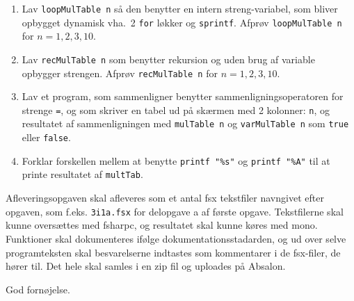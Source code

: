 \documentclass[a4paper,12pt]{article}
\begin{document}
\begin{enumerate}[label=3i.\arabic*,start=0]
\begin{enumerate}
  \item Lav \lstinline!loopMulTable n! så den benytter en intern streng-variabel, som bliver opbygget dynamisk vha.\ 2 \lstinline!for! løkker og \lstinline!sprintf!.  Afprøv \lstinline!loopMulTable n! for $n= 1, 2, 3, 10$.
  \item Lav \lstinline!recMulTable n! som benytter rekursion og uden brug af variable opbygger strengen. Afprøv \lstinline!recMulTable n! for $n= 1, 2, 3, 10$.
  \item Lav et program, som sammenligner benytter sammenligningsoperatoren for strenge \lstinline!=!, og som skriver en tabel ud på skærmen med 2 kolonner: \lstinline!n!, og resultatet af sammenligningen med \lstinline!mulTable n! og \lstinline!varMulTable n! som \lstinline!true! eller \lstinline!false!.
  \item Forklar forskellen mellem at benytte \lstinline!printf "%s"! og \lstinline!printf "%A"! til at printe resultatet af \lstinline!multTab!.
  \end{enumerate}
\end{enumerate}
Afleveringsopgaven skal afleveres som et antal fsx tekstfiler navngivet efter opgaven, som f.eks. \lstinline!3i1a.fsx! for delopgave a af første opgave. Tekstfilerne skal kunne oversættes med fsharpc, og resultatet skal kunne køres med mono. Funktioner skal dokumenteres ifølge dokumentationsstadarden, og ud over selve programteksten skal besvarelserne indtastes som kommentarer i de fsx-filer, de hører til. Det hele skal samles i en zip fil og uploades på Absalon.

\flushright God fornøjelse.
\end{document}

